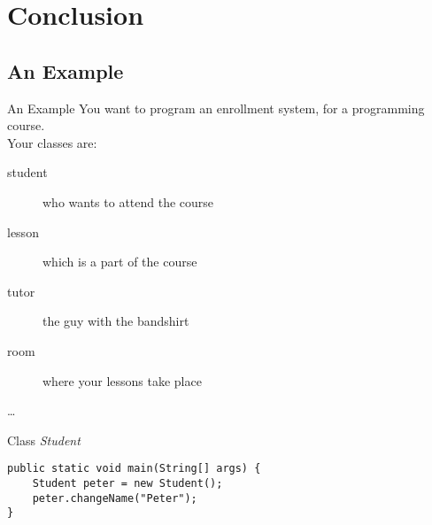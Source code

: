 \section{Conclusion}
\subsection{An Example}

\begin{frame}{An Example}
	You want to program an enrollment system, for a programming course. \\
	\vspace{1em}
	Your classes are:\\
	\begin{description}
		\item[student] who wants to attend the course
		\item[lesson] which is a part of the course
		\item[tutor] the guy with the bandshirt
		\item[room] where your lessons take place
		\item[\dots]
	\end{description}
\end{frame}


\begin{frame}[fragile]{Class \emph{Student}}
\begin{lstlisting}
public static void main(String[] args) {
	Student peter = new Student();
	peter.changeName("Peter");
}
\end{lstlisting}
\end{frame}

